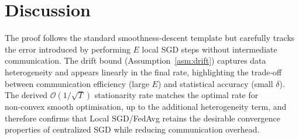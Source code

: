 \documentclass{article}
\begin{document}
\section*{Discussion}
The proof follows the standard smoothness‑descent template but carefully
tracks the error introduced by performing $E$ local SGD steps without
intermediate communication.  The drift bound (Assumption~\ref{asm:drift})
captures data heterogeneity and appears linearly in the final rate,
highlighting the trade‑off between communication efficiency (large $E$)
and statistical accuracy (small $\delta$).  The derived $\mathcal{O}(1/\sqrt{T})$
stationarity rate matches the optimal rate for non‑convex smooth optimisation,
up to the additional heterogeneity term, and therefore confirms that
Local SGD/FedAvg retains the desirable convergence properties of centralized
SGD while reducing communication overhead.
\end{document}
